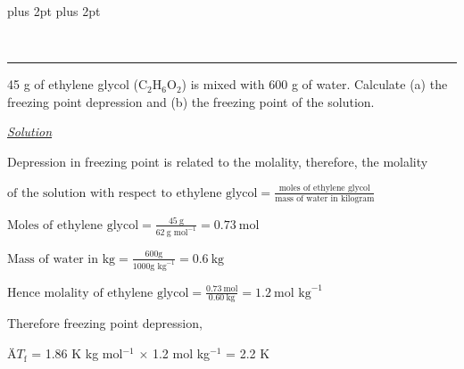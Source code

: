 \documentclass[11pt,a4paper]{article}
\renewcommand{\normalsize}{\fontsize{10.5bp}{12.7bp}\selectfont\abovedisplayskip=4pt plus 2pt\belowdisplayskip=4pt plus 2pt\abovedisplayshortskip=2pt\belowdisplayshortskip=2pt}
\begin{document}
\normalsize


\begin{tcolorbox}[enhanced,colback=white,colframe=gray!40,boxrule=0.8pt,arc=2mm,left=24pt,right=8pt,top=4pt,bottom=6pt,boxsep=0pt,drop fuzzy shadow=gray!40,overlay={\fill[SkyBlue] (frame.south west) rectangle ([xshift=14pt]frame.north west);}]
\noindent\begin{minipage}[t]{0.17\linewidth}
\\[-3pt]
{\color{DeepSkyBlue3}\rule{\linewidth}{0.8pt}}
\end{minipage}\hfill
\begin{minipage}[t]{0.81\linewidth}
45 g of ethylene glycol (C$_2$H$_6$O$_2$) is mixed with 600 g of water. Calculate (a) the freezing point depression and (b) the freezing point of the solution.
\end{minipage}

\vspace{8pt}
\noindent\begin{minipage}[t]{0.17\linewidth}
{\color{DeepSkyBlue3}\large\itshape\underline{Solution}}
\end{minipage}\hfill
\begin{minipage}[t]{0.81\linewidth}
Depression in freezing point is related to the molality, therefore, the molality

\noindent$\displaystyle \text{of the solution with respect to ethylene glycol} = \frac{\text{moles of ethylene glycol}}{\text{mass of water in kilogram}}$

\noindent$\displaystyle \text{Moles of ethylene glycol} = \frac{45\ \text{g}}{62\ \text{g mol}^{-1}} = 0.73\ \text{mol}$

\noindent$\displaystyle \text{Mass of water in kg} = \frac{600\text{g}}{1000\text{g kg}^{-1}} = 0.6\ \text{kg}$

\noindent$\displaystyle \text{Hence molality of ethylene glycol} = \frac{0.73\ \text{mol}}{0.60\ \text{kg}} = 1.2\ \text{mol kg}^{-1}$

Therefore freezing point depression,

\hspace*{1.5em}\"A$T_\text{f}$ = 1.86 K kg mol$^{-1}$ $\times$ 1.2 mol kg$^{-1}$ = 2.2 K


\end{minipage}
\end{tcolorbox}
\end{document}
